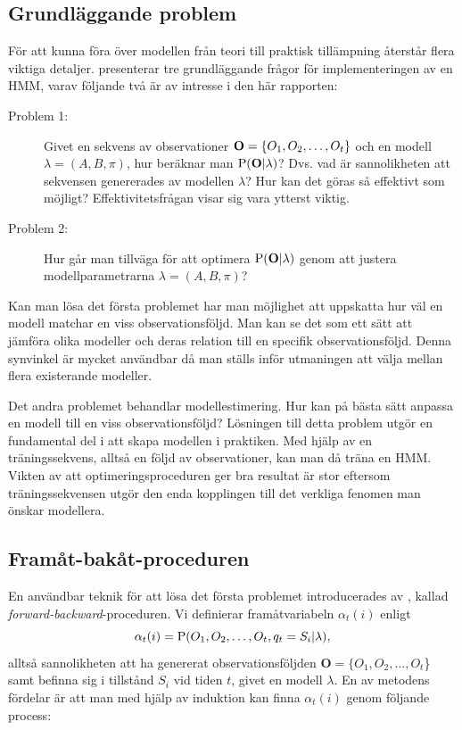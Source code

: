 \documentclass[../rapport_MVEX01-11-05]{subfiles}
\begin{document}
\subsection{Grundläggande problem}
För att kunna föra över modellen från teori till praktisk tillämpning
återstår flera viktiga detaljer.  presenterar
tre grundläggande frågor för implementeringen av en HMM, varav följande
två är av intresse i den här rapporten:
\begin{description}
\item[Problem 1:] Givet en sekvens av observationer
  $\mathbf{O}=\{O_1,O_2,\dots,O_t\}$ och en modell $\lambda = (A,B,\pi)$, hur
  beräknar man $\mathrm{P}(\mathbf{O}|\lambda)$? Dvs. vad är sannolikheten att
  sekvensen genererades av modellen $\lambda$? Hur kan
  det göras så effektivt som möjligt? Effektivitetsfrågan visar sig
  vara ytterst viktig. 
\item[Problem 2:] Hur går man tillväga för att optimera
  $\mathrm{P}(\mathbf{O}|\lambda)$ genom att justera
  modellparametrarna $\lambda = (A,B,\pi)$? 
\end{description}

Kan man lösa det första problemet har man möjlighet att uppskatta hur
väl en modell matchar en viss observationsföljd. Man kan se det som
ett sätt att jämföra olika modeller och
deras relation till en specifik observationsföljd. Denna synvinkel är
mycket användbar då man ställs inför utmaningen att välja mellan
flera existerande modeller. 

Det andra problemet behandlar modellestimering. Hur kan på bästa
sätt anpassa en modell till en viss observationsföljd?
Lösningen till detta problem utgör en fundamental del i
att skapa modellen i  praktiken.
Med hjälp av en träningssekvens, alltså en följd av
observationer, kan man då träna en HMM. Vikten av att
optimeringsproceduren ger bra resultat är stor eftersom
träningssekvensen utgör den enda kopplingen till det verkliga fenomen
man önskar modellera.      

\subsection{Framåt-bakåt-proceduren}
En användbar teknik för att lösa det första problemet introducerades av , kallad
\emph{forward-backward}-proceduren. Vi
definierar framåtvariabeln $\alpha_t(i)$ enligt
\begin{equation*}
\alpha_t(i) = \mathrm{P}(O_1,O_2,\dots,O_t,q_t = S_i | \lambda),
\end{equation*}
alltså sannolikheten att ha genererat observationsföljden $\textbf{O}
= \{O_1,O_2,\dots,O_t$\} samt befinna sig i tillstånd $S_i$ vid tiden
$t$, givet en modell $\lambda$. En av metodens fördelar är att man med
hjälp av induktion kan finna $\alpha_t(i)$ genom följande process:
\end{document}
